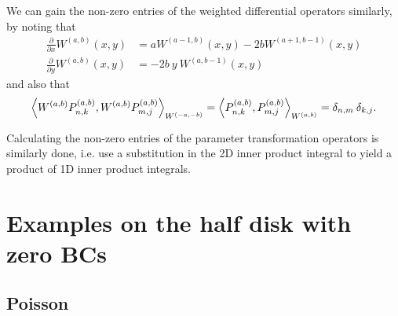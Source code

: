 \documentclass[11pt, oneside]{article}   	%
\newcommand{\pddx}{\frac{\partial}{\partial x}}
\newcommand{\pddy}{\frac{\partial}{\partial y}}
\newcommand{\Pab}{P^{(a,b)}}
\newcommand{\Pnkab}{P_{n,k}^{(a,b)}}
\newcommand{\Wab}{{W^{(a,b)}}}
\begin{document}
We can gain the non-zero entries of the weighted differential operators similarly, by noting that
\begin{align}
	\pddx \Wab(x,y) &= a W^{(a-1, b)}(x,y) - 2bW^{(a+1, b-1)}(x,y) \\
	\pddy \Wab(x,y) &= -2b \: y \: W^{(a, b-1)}(x,y)
\end{align}
and also that
\begin{align}
	\ip< \Wab \Pnkab, \Wab \Pab_{m,j} >_{W^{(-a, -b)}} = \ip< \Pnkab, \Pab_{m,j} >_\Wab = \delta_{n,m} \: \delta_{k,j}.
\end{align}

Calculating the non-zero entries of the parameter transformation operators is similarly done, i.e. use a substitution in the 2D inner product integral to yield a product of 1D inner product integrals. 


%
\section{Examples on the half disk with zero BCs}\label{Section:Examples}


\subsection{Poisson}
\end{document}
